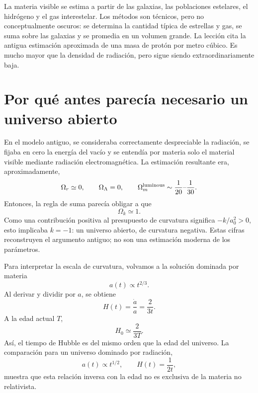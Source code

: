 La materia visible se estima a partir de las galaxias, las poblaciones estelares, el hidrógeno y el gas interestelar. Los métodos son técnicos, pero no conceptualmente oscuros: se determina la cantidad típica de estrellas y gas, se suma sobre las galaxias y se promedia en un volumen grande. La lección cita la antigua estimación aproximada de una masa de protón por metro cúbico. Es mucho mayor que la densidad de radiación, pero sigue siendo extraordinariamente baja.

\begin{classroomqa}
\end{classroomqa}

\section{Por qué antes parecía necesario un universo abierto}

En el modelo antiguo, se consideraba correctamente despreciable la radiación, se fijaba en cero la energía del vacío y se entendía por materia solo el material visible mediante radiación electromagnética. La estimación resultante era, aproximadamente,
\begin{equation}
\Omega_r\simeq0,
\qquad
\Omega_\Lambda=0,
\qquad
\Omega_m^{\rm luminous}\sim\frac{1}{20}\text{--}\frac{1}{30}.
\end{equation}
Entonces, la regla de suma parecía obligar a que
\begin{equation}
\Omega_k\simeq1.
\end{equation}
Como una contribución positiva al presupuesto de curvatura significa \(-k/a_0^2>0\), esto implicaba \(k=-1\): un universo abierto, de curvatura negativa. Estas cifras reconstruyen el argumento antiguo; no son una estimación moderna de los parámetros.

Para interpretar la escala de curvatura, volvamos a la solución dominada por materia
\begin{equation}
a(t)\propto t^{2/3}.
\end{equation}
Al derivar y dividir por \(a\), se obtiene
\begin{equation}
H(t)=\frac{\dot a}{a}=\frac{2}{3t}.
\label{eq:c06-matter-h}
\end{equation}
A la edad actual \(T\),
\begin{equation}
H_0\simeq\frac{2}{3T}.
\end{equation}
Así, el tiempo de Hubble es del mismo orden que la edad del universo. La comparación para un universo dominado por radiación,
\begin{equation}
a(t)\propto t^{1/2},
\qquad
H(t)=\frac{1}{2t},
\end{equation}
muestra que esta relación inversa con la edad no es exclusiva de la materia no relativista.

